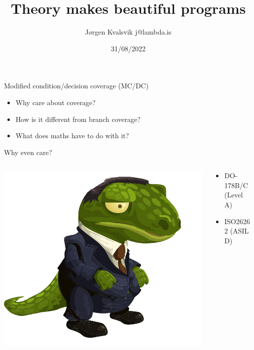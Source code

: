 \documentclass[xcolor = {dvipsnames, table}]{beamer}
\title{Theory makes beautiful programs}
\author{Jørgen Kvalsvik j@lambda.is}
\date{31/08/2022}
\begin{document}
\frame{\titlepage}

\begin{frame}
    Modified condition/decision coverage (MC/DC)

    \begin{itemize}
        \item Why care about coverage?
        \item How is it different from branch coverage?
        \item What does maths have to do with it?
    \end{itemize}
\end{frame}

\begin{frame}
    Why even care?
    \begin{columns}
        \begin{column}{0.5\textwidth}
            \includegraphics[width = \textwidth]{img/bureaucrat.png}
        \end{column}

        \begin{column}{0.5\textwidth}
            \begin{itemize}
                \item DO-178B/C (Level A)
                \item ISO26262 (ASIL D)
            \end{itemize}
        \end{column}
    \end{columns}
\end{frame}
\end{document}
